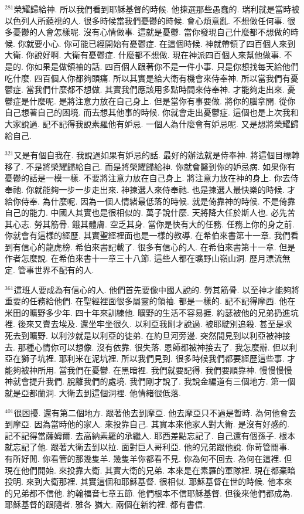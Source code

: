 \documentclass{book}
\begin{document}
$^{281}$榮耀歸給神.
所以我們看到耶穌基督的時候.
他揀選那些愚蠢的.
瑞利就是當時被以色列人所藐視的人.
很多時候當我們憂鬱的時候.
會心煩意亂.
不想做任何事.
很多憂鬱的人會怎樣呢.
沒有心情做事.
這就是憂鬱.
當你發現自己什麼都不想做的時候.
你就要小心.
你可能已經開始有憂鬱症.
在這個時候.
神就帶領了四百個人來到大衛.
你說好啊.
大衛有憂鬱症.
什麼都不想做.
現在神派四百個人來幫他做事.
不是的.
你如果是做領袖的話.
四百個人跟著你不是一件小事.
只是你想找每天給他們吃什麼.
四百個人你都夠頭痛.
所以其實是給大衛有機會來侍奉神.
所以當我們有憂鬱症.
當我們什麼都不想做.
其實我們應該用多點時間來侍奉神.
才能夠走出來.
憂鬱症是什麼呢.
是將注意力放在自己身上.
但是當你有事要做.
將你的腦拿開.
從你自己想著自己的困境.
而去想其他事的時候.
你就會走出憂鬱症.
這個也是上次我和大家說過.
記不記得我說素羅他有妒忌.
一個人為什麼會有妒忌呢.
又是想將榮耀歸給自己.

$^{321}$又是有個自我在.
我說過如果有妒忌的話.
最好的辦法就是侍奉神.
將這個目標轉移了.
不是將榮耀歸給自己.
而是將榮耀歸給神.
你就會醫到你的妒忌病.
如果你有憂鬱的話是一模一樣.
不要將注意力放在自己身上.
將注意力放在神的身上.
你去侍奉祂.
你就能夠一步一步走出來.
神揀選人來侍奉祂.
也是揀選人最快樂的時候.
才給你侍奉.
為什麼呢.
因為一個人情緒最低落的時候.
就是倚靠神的時候.
不是倚靠自己的能力.
中國人其實也是很相似的.
萬子說什麼.
天將降大任於斯人也.
必先苦其心志.
勞其筋骨.
餓其體膚.
空乏其身.
當你是快有大的任務.
任務上你的身之前.
你就會有這樣的經歷.
其實聖經裡面也是一樣的教導.
在希伯來書第十一章.
我們看到有信心的龍虎榜.
希伯來書記載了.
很多有信心的人.
在希伯來書第十一章.
但是作者怎麼說.
在希伯來書十一章三十八節.
這些人都在曠野山嶺山洞.
歷月漂流無定.
管事世界不配有的人.

$^{361}$這班人要成為有信心的人.
他們首先要像中國人說的.
勞其筋骨.
以至神才能夠將重要的任務給他們.
在聖經裡面很多屬靈的領袖.
都是一樣的.
記不記得摩西.
他在米田的曠野多少年.
四十年來訓練他.
曠野的生活不容易捱.
約瑟被他的兄弟扔進坑裡.
後來又賣去埃及.
還坐牢坐很久.
以利亞我剛才說過.
被耶駛別追殺.
甚至是求死去到曠野.
以利沙就是以利亞的徒弟.
在約旦河旁邊.
突然間見到以利亞被神接去.
那種心情你可以想像.
沒有依靠.
很失落.
恩師都被神接去了.
我怎麼辦.
但以利亞在獅子坑裡.
耶利米在泥坑裡.
所以我們見到.
很多時候我們都要經歷這些事.
才能夠被神所用.
當我們在憂鬱.
在黑暗裡.
我們就要記得.
我們要順靠神.
慢慢慢慢神就會提升我們.
脫離我們的處境.
我們剛才說了.
我說金編道有三個地方.
第一個就是亞都蘭洞.
大衛去到這個洞裡.
他情緒很低落.

$^{401}$很困擾.
還有第二個地方.
跟著他去到摩亞.
他去摩亞只不過是暫時.
為何他會去到摩亞.
因為當時他的家人.
來投靠自己.
其實本來他家人對大衛.
是沒有好感的.
記不記得當薩姆爾.
去高納素羅的承繼人.
耶西差點忘記了.
自己還有個孫子.
根本就忘記了他.
跟著大衛去到以拉.
面對巨人哥利亞.
他的兄弟跟他說.
你苛管閒事.
有所好閒.
你看管的那幾隻羊.
幾隻羊你都看不見.
你為何不回去.
為何在這裡.
但現在他們開始.
來投靠大衛.
其實大衛的兄弟.
本來是在素羅的軍隊裡.
現在都棄暗投明.
來到大衛那裡.
其實這個和耶穌基督.
很相似.
耶穌基督在世的時候.
他本來的兄弟都不信他.
約翰福音七章五節.
他們根本不信耶穌基督.
但後來他們都成為.
耶穌基督的跟隨者.
雅各 猶大.
兩個在新約裡.
都有書信.
\end{document}
